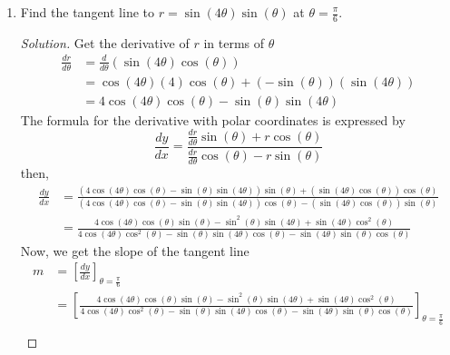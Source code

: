 \documentclass[12pt]{article}
\begin{document}
		\begin{enumerate}
			\item[1.] Find the tangent line to \(r=\sin \left(4\theta\right)\sin\left(\theta\right)\) at \(\theta=\frac{\pi}{6}\).
			
			\begin{proof}[Solution]
				Get the derivative of \(r\) in terms of \(\theta\)
				\begin{align*}
					\frac{dr}{d\theta} & = \frac{d}{d\theta} \left(\sin\left(4\theta\right)\cos \left(\theta\right)\right) \\
					& = \cos\left(4\theta\right)(4)\cos \left(\theta\right)+\left(-\sin\left(\theta\right)\right)\left(\sin\left(4\theta\right)\right) \\
					& = 4\cos\left(4\theta\right)\cos\left(\theta\right)-\sin\left(\theta\right)\sin\left(4\theta\right)
				\end{align*}
				The formula for the derivative with polar coordinates is expressed by
				\[\frac{dy}{dx} = \frac{\frac{dr}{d\theta}\sin\left(\theta\right)+r\cos\left(\theta\right)}{\frac{dr}{d\theta}\cos\left(\theta\right)-r\sin\left(\theta\right)}\]
				then,
				\begin{align*}
					\frac{dy}{dx} & = \frac{\left(4\cos\left(4\theta\right)\cos\left(\theta\right)-\sin\left(\theta\right)\sin\left(4\theta\right)\right)\sin\left(\theta\right)+\left(\sin\left(4\theta\right)\cos\left(\theta\right)\right)\cos\left(\theta\right)}{\left(4\cos\left(4\theta\right)\cos\left(\theta\right)-\sin\left(\theta\right)\sin\left(4\theta\right)\right)\cos\left(\theta\right)-\left(\sin\left(4\theta\right)\cos\left(\theta\right)\right)\sin\left(\theta\right)} \\
					& = \frac{4\cos\left(4\theta\right)\cos\left(\theta\right)\sin\left(\theta\right)-\sin^2\left(\theta\right)\sin\left(4\theta\right)+\sin\left(4\theta\right)\cos^2\left(\theta\right)}{4\cos\left(4\theta\right)\cos^2\left(\theta\right)-\sin\left(\theta\right)\sin\left(4\theta\right)\cos\left(\theta\right)-\sin\left(4\theta\right)\sin\left(\theta\right)\cos\left(\theta\right)}
				\end{align*}
				Now, we get the slope of the tangent line
				\begin{align*}
					m & = \left[\frac{dy}{dx}\right]_{\theta=\frac{\pi}{6}} \\
					& = \left[\frac{4\cos\left(4\theta\right)\cos\left(\theta\right)\sin\left(\theta\right)-\sin^2\left(\theta\right)\sin\left(4\theta\right)+\sin\left(4\theta\right)\cos^2\left(\theta\right)}{4\cos\left(4\theta\right)\cos^2\left(\theta\right)-\sin\left(\theta\right)\sin\left(4\theta\right)\cos\left(\theta\right)-\sin\left(4\theta\right)\sin\left(\theta\right)\cos\left(\theta\right)}\right]_{\theta=\frac{\pi}{6}} \\

\end{align*}
\end{proof}
\end{enumerate}
\end{document}
